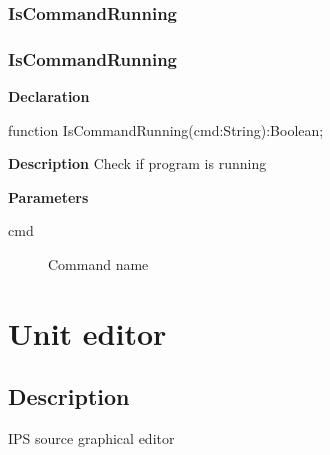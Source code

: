 \documentclass{report}
\newif\ifpdf
\begin{document}
\subsection*{\large{\textbf{IsCommandRunning}}\normalsize\hspace{1ex}\hrulefill}
\else
\subsection*{IsCommandRunning}
\fi
\label{distri-IsCommandRunning}
\begin{list}{}{
\setlength{\itemindent}{0cm}
\setlength{\listparindent}{0cm}
\setlength{\leftmargin}{\evensidemargin}
\addtolength{\leftmargin}{\tmplength}
\settowidth{\labelsep}{X}
\addtolength{\leftmargin}{\labelsep}
\setlength{\labelwidth}{\tmplength}
}
\item[\textbf{Declaration}\hfill]
\ifpdf
\begin{flushleft}
\fi
\begin{ttfamily}
function IsCommandRunning(cmd:String):Boolean;\end{ttfamily}

\ifpdf
\end{flushleft}
\fi

\par
\item[\textbf{Description}]
Check if program is running \par
\item[\textbf{Parameters}]
\begin{description}
\item[cmd] Command name
\end{description}


\end{list}
\chapter{Unit editor}
\label{editor}
\section{Description}
IPS source graphical editor
\end{document}
